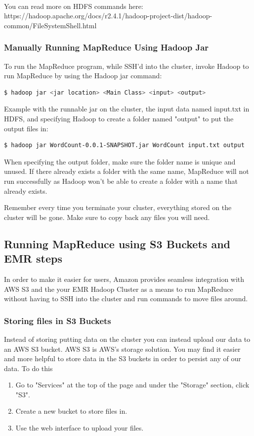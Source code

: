 \documentclass{article}
\begin{document}
\-\ \\ You can read more on HDFS commands here:\\ https://hadoop.apache.org/docs/r2.4.1/hadoop-project-dist/hadoop-common/FileSystemShell.html
 
 \subsubsection{Manually Running MapReduce Using Hadoop Jar}
To run the MapReduce program, while SSH'd into the cluster, invoke Hadoop to run MapReduce by using the Hadoop jar command:
\begin{lstlisting}[language=bash]
  $ hadoop jar <jar location> <Main Class> <input> <output>
\end{lstlisting}
Example with the runnable jar on the cluster, the input data named input.txt in HDFS, and specifying Hadoop to create a folder named "output" to put the output files in:
\begin{lstlisting}[language=bash]
  $ hadoop jar WordCount-0.0.1-SNAPSHOT.jar WordCount input.txt output
\end{lstlisting}


\begin{info}
When specifying the output folder, make sure the folder name is unique and unused. If there already exists a folder with the same name, MapReduce will not run successfully as Hadoop won't be able to create a folder with a name that already exists.
\end{info}

 \begin{info}
Remember every time you terminate your cluster, everything stored on the cluster will be gone. Make sure to copy back any files you will need.
\end{info}

 
\subsection{Running MapReduce using S3 Buckets and EMR steps}
In order to make it easier for users, Amazon provides seamless integration with AWS S3 and the your EMR Hadoop Cluster as a means to run MapReduce without having to SSH into the cluster and run commands to move files around.
\subsubsection{Storing files in S3 Buckets}
Instead of storing putting data on the cluster you can instead upload our data to an AWS S3 bucket. AWS S3 is AWS's storage solution. You may find it easier and more helpful to store data in the S3 buckets in order to persist any of our data. To do this
\begin{enumerate} 
    \item Go to "Services" at the top of the page and under the "Storage" section, click "S3". 
    \item Create a new bucket to store files in. 
    \item Use the web interface to upload your files.
\end{enumerate}
\end{document}
